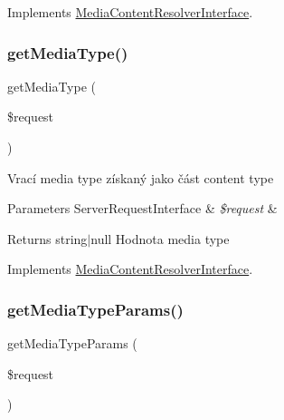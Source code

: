 Implements \mbox{\hyperlink{interface_pes_1_1_http_1_1_request_1_1_media_content_resolver_interface_a5e069384f33f60671b832beae5260d9b}{Media\+Content\+Resolver\+Interface}}.

\mbox{\label{class_pes_1_1_http_1_1_request_1_1_media_content_resolver_ae31cd4d8b2526963e57f814b543d2b52}} 
\subsubsection{\texorpdfstring{get\+Media\+Type()}{getMediaType()}}
{\footnotesize\ttfamily get\+Media\+Type (\begin{DoxyParamCaption}\item[{Server\+Request\+Interface}]{\$request }\end{DoxyParamCaption})}

Vrací media type získaný jako část content type


\begin{DoxyParams}[1]{Parameters}
Server\+Request\+Interface & {\em \$request} & \\
\hline
\end{DoxyParams}
\begin{DoxyReturn}{Returns}
string$\vert$null Hodnota media type 
\end{DoxyReturn}


Implements \mbox{\hyperlink{interface_pes_1_1_http_1_1_request_1_1_media_content_resolver_interface_ae31cd4d8b2526963e57f814b543d2b52}{Media\+Content\+Resolver\+Interface}}.

\mbox{\label{class_pes_1_1_http_1_1_request_1_1_media_content_resolver_af1d02209d81e589acebb7d0afecbe6da}} 
\subsubsection{\texorpdfstring{get\+Media\+Type\+Params()}{getMediaTypeParams()}}
{\footnotesize\ttfamily get\+Media\+Type\+Params (\begin{DoxyParamCaption}\item[{Server\+Request\+Interface}]{\$request }\end{DoxyParamCaption})}

